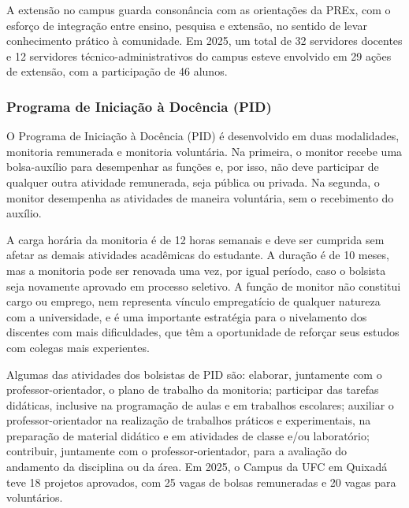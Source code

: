 A extensão no campus guarda consonância com as orientações da PREx, com o esforço de integração entre ensino, pesquisa e extensão, no sentido de levar conhecimento prático à comunidade. Em 2025, um total de 32 servidores docentes e 12 servidores técnico-administrativos do campus esteve envolvido em 29 ações de extensão, com a participação de 46 alunos.



\subsubsection{Programa de Iniciação à Docência (PID)}

O Programa de Iniciação à Docência (PID) é desenvolvido em duas modalidades, monitoria remunerada e monitoria voluntária. Na primeira, o monitor recebe uma bolsa-auxílio para desempenhar as funções e, por isso, não deve participar de qualquer outra atividade remunerada, seja pública ou privada. Na segunda, o monitor desempenha as atividades de maneira voluntária, sem o recebimento do auxílio.

A carga horária da monitoria é de 12 horas semanais e deve ser cumprida sem afetar as demais atividades acadêmicas do estudante. A duração é de 10 meses, mas a monitoria pode ser renovada uma vez, por igual período, caso o bolsista seja novamente aprovado em processo seletivo. A função de monitor não constitui cargo ou emprego, nem representa vínculo empregatício de qualquer natureza com a universidade, e é uma importante estratégia para o nivelamento dos discentes com mais dificuldades, que têm a oportunidade de reforçar seus estudos com colegas mais experientes.

Algumas das atividades dos bolsistas de PID são: elaborar, juntamente com o professor-orientador, o plano de trabalho da monitoria; participar das tarefas didáticas, inclusive na programação de aulas e em trabalhos escolares; auxiliar o professor-orientador na realização de trabalhos práticos e experimentais, na preparação de material didático e em atividades de classe e/ou laboratório; contribuir, juntamente com o professor-orientador, para a avaliação do andamento da disciplina ou da área. Em 2025, o Campus da UFC em Quixadá teve 18 projetos aprovados, com 25 vagas de bolsas remuneradas e 20 vagas para voluntários.

